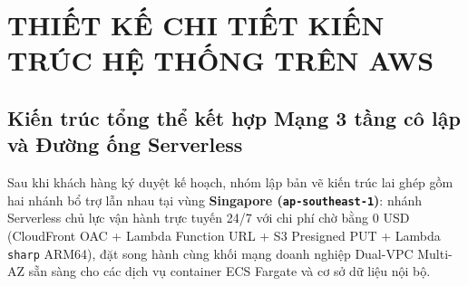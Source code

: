 \documentclass[12pt,a4paper]{report}
\begin{document}
\chapter{THIẾT KẾ CHI TIẾT KIẾN TRÚC HỆ THỐNG TRÊN AWS}

\section{Kiến trúc tổng thể kết hợp Mạng 3 tầng cô lập và Đường ống Serverless}
Sau khi khách hàng ký duyệt kế hoạch, nhóm lập bản vẽ kiến trúc lai ghép gồm hai nhánh bổ trợ lẫn nhau tại vùng \textbf{Singapore (\texttt{ap-southeast-1})}: nhánh Serverless chủ lực vận hành trực tuyến 24/7 với chi phí chờ bằng 0 USD (CloudFront OAC + Lambda Function URL + S3 Presigned PUT + Lambda \texttt{sharp} ARM64), đặt song hành cùng khối mạng doanh nghiệp Dual-VPC Multi-AZ sẵn sàng cho các dịch vụ container ECS Fargate và cơ sở dữ liệu nội bộ.
\end{document}
